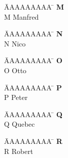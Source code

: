 \documentclass[a4paper, fleqn, headsepline, footsepline, 12pt, parskip=half]{scrartcl}
\begin{document}
\vspace*{-1.5cm}
\begin{tabbing}
	\hspace{0.0cm}  \= AAAAAAAAA \=       \hspace{2cm} \kill
	\>\textbf{M} 	\> \\
	\>M 			\>  Manfred\\
\end{tabbing} 

\vspace*{-1.5cm}
\begin{tabbing}
	\hspace{0.0cm}  \= AAAAAAAAA \=       \hspace{2cm} \kill
	\>\textbf{N} 	\> \\
	\>N 			\>  Nico\\
\end{tabbing}

\vspace*{-1.5cm}
\begin{tabbing}
	\hspace{0.0cm}  \= AAAAAAAAA \=       \hspace{2cm} \kill
	\>\textbf{O} 	\> \\
	\>O 			\>  Otto\\
\end{tabbing}

\vspace*{-1.5cm}
\begin{tabbing}
	\hspace{0.0cm}  \= AAAAAAAAA \=       \hspace{2cm} \kill
	\>\textbf{P} 	\> \\
	\>P 			\>  Peter\\
\end{tabbing}

\vspace*{-1.5cm}
\begin{tabbing}
	\hspace{0.0cm}  \= AAAAAAAAA \=       \hspace{2cm} \kill
	\>\textbf{Q} 	\> \\
	\>Q 			\>  Quebec\\
\end{tabbing}

\vspace*{-1.5cm}
\begin{tabbing}
	\hspace{0.0cm}  \= AAAAAAAAA \=       \hspace{2cm} \kill
	\>\textbf{R} 	\> \\
	\>R 			\>  Robert\\
\end{tabbing}
\end{document}
